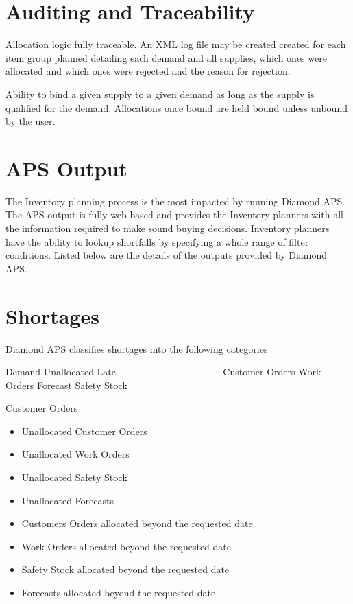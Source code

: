 \documentclass[letterpaper,10pt,english]{sphinxmanual}
\begin{document}
\section{Auditing and Traceability}
\label{APS/Introduction:auditing-and-traceability}
Allocation logic fully traceable. An XML log file may be created created
for each item group planned detailing each demand and all supplies,
which ones were allocated and which ones were rejected and the reason
for rejection.

Ability to bind a given supply to a given demand as long as the supply
is qualified for the demand. Allocations once bound are held bound
unless unbound by the user.


\section{APS Output}
\label{APS/Introduction:aps-output}
The Inventory planning process is the most impacted by running Diamond
APS. The APS output is fully web-based and provides the Inventory
planners with all the information required to make sound buying
decisions. Inventory planners have the ability to lookup shortfalls by
specifying a whole range of filter conditions. Listed below are the
details of the outputs provided by Diamond APS.


\section{Shortages}
\label{APS/Introduction:shortages}
Diamond APS classifies shortages into the following categories

Demand           Unallocated     Late
---------------  -----------     ----
Customer Orders
Work Orders
Forecast
Safety Stock

Customer Orders
\begin{itemize}
\item {} 
Unallocated Customer Orders

\item {} 
Unallocated Work Orders

\item {} 
Unallocated Safety Stock

\item {} 
Unallocated Forecasts

\item {} 
Customers Orders allocated beyond the requested date

\item {} 
Work Orders allocated beyond the requested date

\item {} 
Safety Stock allocated beyond the requested date

\item {} 
Forecasts allocated beyond the requested date

\end{itemize}
\end{document}
